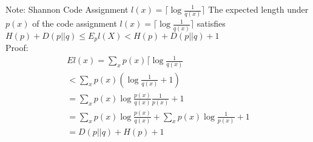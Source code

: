 \documentclass[10pt]{article}
\begin{document}
\begin{tiny}
\begin{multicols}{3}
Note: Shannon Code Assignment $l(x) = \lceil \log \frac {1}{q(x)} \rceil$
 \label{thm:wrongcode}
The expected length under ${p(x)}$ of the code assignment ${l(x)}=\lceil\log\frac{1}{q(x)}\rceil$ satisfies 
$H(p)+D(p||q) \leq E_pl(X)<H(p)+D(p||q)+1$ \\
Proof: 
\begin{eqnarray}
El(x) = \sum_x p(x) \lceil\log \frac{1}{q(x)} \\
< \sum_x p(x) (\log \frac{1}{q(x)} + 1) \\
= \sum_x p(x) \log \frac{p(x)}{q(x)} \frac{1}{p(x)} + 1 \\
= \sum_x p(x) \log \frac{p(x)}{q(x)} + \sum_x p(x) \log \frac{1}{p(x)} + 1 \\
= D(p||q) + H(p) + 1
\end{eqnarray}





\end{multicols}
\end{tiny}
\end{document}
